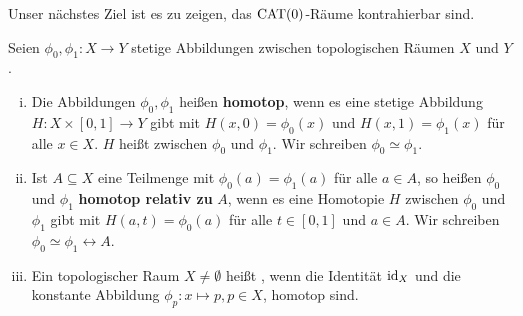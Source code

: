 Unser nächstes Ziel ist es zu zeigen, das $\operatorname{CAT(0)}$-Räume kontrahierbar sind.

\begin{definition}[Homotopie]
\label{def:1.17}
	Seien $\phi_0,\phi_1 \colon X \rightarrow Y$ stetige Abbildungen zwischen topologischen Räumen $X$ und $Y$.
	\begin{enumerate}[(i)]
		\item Die Abbildungen $\phi_0, \phi_1$ heißen \textbf{homotop}, wenn es eine stetige Abbildung $H \colon X \times [0,1] \rightarrow Y$ gibt mit $H(x,0) = \phi_0(x)$ und $H(x,1) = \phi_1(x)$ für alle $x \in X$. $H$ heißt  zwischen $\phi_0$ und $\phi_1$. Wir schreiben $\phi_0 \simeq \phi_1$.
		\item Ist $A \subseteq X$ eine Teilmenge mit $\phi_0(a) = \phi_1(a)$ für alle $a \in A$, so heißen $\phi_0$ und $\phi_1$ \textbf{homotop relativ zu} $A$, wenn es eine Homotopie $H$ zwischen $\phi_0$ und $\phi_1$ gibt mit $H(a,t) = \phi_0(a)$ für alle $t \in [0,1]$ und $a \in A$. Wir schreiben $\phi_0 \simeq \phi_1 \rel A$.
		\item Ein topologischer Raum $X \neq \emptyset$ heißt , wenn die Identität $\operatorname{id}_X$ und die konstante Abbildung $\phi_p\colon x \mapsto p, p \in X$, homotop sind.
	\end{enumerate}
\end{definition}

